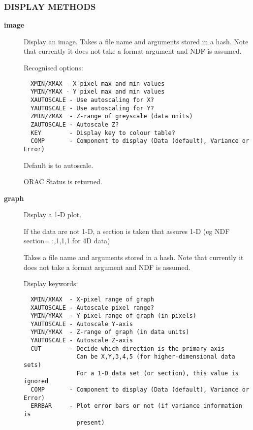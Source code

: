 \subsubsection*{DISPLAY METHODS\label{ORAC::Display::KAPVIEW_DISPLAY_METHODS}}
\begin{description}

\item[\textbf{image}] \mbox{}

Display an image.
Takes a file name and arguments stored in a hash.
Note that currently it does not take a format argument
and NDF is assumed.



Recognised options:

\begin{verbatim}
  XMIN/XMAX - X pixel max and min values
  YMIN/YMAX - Y pixel max and min values
  XAUTOSCALE - Use autoscaling for X?
  YAUTOSCALE - Use autoscaling for Y?
  ZMIN/ZMAX  - Z-range of greyscale (data units)
  ZAUTOSCALE - Autoscale Z?
  KEY        - Display key to colour table?
  COMP       - Component to display (Data (default), Variance or Error)
\end{verbatim}


Default is to autoscale.



ORAC Status is returned.


\item[\textbf{graph}] \mbox{}

Display a 1-D plot.



If the data are not 1-D, a section is taken that assures
1-D (eg NDF section= :,1,1,1 for 4D data)



Takes a file name and arguments stored in a hash.
Note that currently it does not take a format argument
and NDF is assumed.



Display keywords:

\begin{verbatim}
  XMIN/XMAX  - X-pixel range of graph
  XAUTOSCALE - Autoscale pixel range?
  YMIN/YMAX  - Y-pixel range of graph (in pixels)
  YAUTOSCALE - Autoscale Y-axis
  YMIN/YMAX  - Z-range of graph (in data units)
  YAUTOSCALE - Autoscale Z-axis
  CUT        - Decide which direction is the primary axis
               Can be X,Y,3,4,5 (for higher-dimensional data sets)
               For a 1-D data set (or section), this value is ignored
  COMP       - Component to display (Data (default), Variance or Error)
  ERRBAR     - Plot error bars or not (if variance information is
               present)
\end{verbatim}



\end{description}
